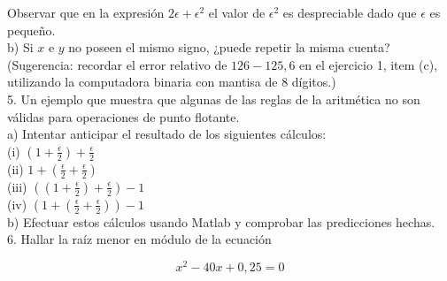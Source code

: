 \documentclass[10pt]{article}
\begin{document}
Observar que en la expresión $2 \epsilon+\epsilon^{2}$ el valor de $\epsilon^{2}$ es despreciable dado que $\epsilon$ es pequeño.\\
b) Si $x$ e $y$ no poseen el mismo signo, ¿puede repetir la misma cuenta? (Sugerencia: recordar el error relativo de $126-125,6$ en el ejercicio 1, item (c), utilizando la computadora binaria con mantisa de 8 dígitos.)\\
5. Un ejemplo que muestra que algunas de las reglas de la aritmética no son válidas para operaciones de punto flotante.\\
a) Intentar anticipar el resultado de los siguientes cálculos:\\
(i) $\left(1+\frac{\epsilon}{2}\right)+\frac{\epsilon}{2}$\\
(ii) $1+\left(\frac{\epsilon}{2}+\frac{\epsilon}{2}\right)$\\
(iii) $\left(\left(1+\frac{\epsilon}{2}\right)+\frac{\epsilon}{2}\right)-1$\\
(iv) $\left(1+\left(\frac{\epsilon}{2}+\frac{\epsilon}{2}\right)\right)-1$\\
b) Efectuar estos cálculos usando Matlab y comprobar las predicciones hechas.\\
6. Hallar la raíz menor en módulo de la ecuación

$$
x^{2}-40 x+0,25=0
$$
\end{document}

